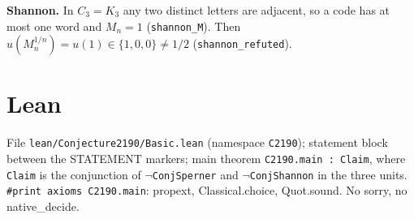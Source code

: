 \documentclass[11pt]{article}
\begin{document}
\textbf{Shannon.} In $C_3=K_3$ any two distinct letters are adjacent, so a code has at most one word and $M_n=1$ (\texttt{shannon\_M}). Then $u(M_n^{1/n})=u(1)\in\{1,0,0\}\neq 1/2$ (\texttt{shannon\_refuted}).

\section*{Lean}
File \texttt{lean/Conjecture2190/Basic.lean} (namespace \texttt{C2190}); statement block between the STATEMENT markers; main theorem \texttt{C2190.main : Claim}, where \texttt{Claim} is the conjunction of $\neg$\texttt{ConjSperner} and $\neg$\texttt{ConjShannon} in the three units. \texttt{\#print axioms C2190.main}: propext, Classical.choice, Quot.sound. No sorry, no native\_decide.
\end{document}
